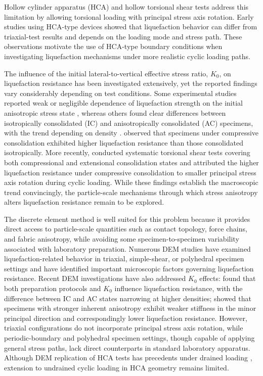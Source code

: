 \documentclass[a4paper,fleqn]{cas-sc}
\newcommand{\Kzero}{\ensuremath{K_0}}
\providecommand{\DIFaddbegin}{} %
\begin{document}
Hollow cylinder apparatus (HCA) and hollow torsional shear tests address this limitation by allowing torsional loading with principal stress axis rotation. Early studies using HCA-type devices \citep[e.g.,][]{IshiharaYasuda1975,Tatsuoka1986,YamashitaToki1993} showed that liquefaction behavior can differ from triaxial-test results and depends on the loading mode and stress path. These observations motivate the use of HCA-type boundary conditions when investigating liquefaction mechanisms under more realistic cyclic loading paths.

The influence of the initial lateral-to-vertical effective stress ratio, \Kzero{}, on liquefaction resistance has been investigated extensively, yet the reported findings vary considerably depending on test conditions. Some experimental studies reported weak or negligible dependence of liquefaction strength on the initial anisotropic stress state \citep[e.g.,][]{IshiharaTakatsu1979,YamashitaToki1993}, whereas others found clear differences between isotropically consolidated (IC) and anisotropically consolidated (AC) specimens, with the trend depending on density \citep{GeorgiannouKonstadinou2014}. \citet{Vargas2020} observed that specimens under compressive consolidation exhibited higher liquefaction resistance than those consolidated isotropically. More recently, \citet{Zhao2024} conducted systematic torsional shear tests covering both compressional and extensional consolidation states and attributed the higher liquefaction resistance under compressive consolidation to smaller principal stress axis rotation during cyclic loading. While these findings establish the macroscopic trend convincingly, the particle-scale mechanisms through which stress anisotropy alters liquefaction resistance remain to be explored.

The discrete element method \citep[DEM;][]{Cundall1979} is well suited for this problem because it provides direct access to particle-scale quantities such as contact topology, force chains, and fabric anisotropy, while avoiding some specimen-to-specimen variability associated with laboratory preparation. Numerous DEM studies have examined liquefaction-related behavior in triaxial, simple-shear, or polyhedral specimen settings \citep[e.g.,][]{Huang2018,Yang2021,Jiang2021,Morimoto2021,WuYang2022,Xie2023,YangHuang2023,Zhang2023} and have identified important microscopic factors governing liquefaction resistance. Recent DEM investigations have also addressed \Kzero{} effects: \citet{YangTaiebat2024} found that both preparation protocols and \Kzero{} influence liquefaction resistance, with the difference between IC and AC states narrowing at higher densities; \citet{Otsubo2022} showed that specimens with stronger inherent anisotropy exhibit weaker stiffness in the minor principal direction and correspondingly lower liquefaction resistance. However, triaxial configurations do not incorporate principal stress axis rotation, while periodic-boundary and polyhedral specimen settings, though capable of applying general stress paths, lack direct counterparts in standard laboratory apparatus. Although DEM replication of HCA tests has precedents under drained loading \citep[e.g.,][]{Li2014,Liu2021}, extension to undrained cyclic loading in HCA geometry remains limited.
\DIFaddbegin 
\end{document}

